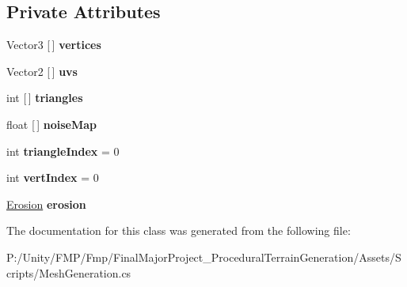 \subsection*{Private Attributes}
\begin{DoxyCompactItemize}
\item 
\mbox{\label{class_assets_1_1_scripts_1_1_mesh_generation_a799f950228628cccb1aa8833e8e697e5}} 
Vector3 \mbox{[}$\,$\mbox{]} {\bfseries vertices}
\item 
\mbox{\label{class_assets_1_1_scripts_1_1_mesh_generation_a3bc484817c8bdafc772df0e3450b6a6e}} 
Vector2 \mbox{[}$\,$\mbox{]} {\bfseries uvs}
\item 
\mbox{\label{class_assets_1_1_scripts_1_1_mesh_generation_acc68d6d74ad0eaa72a23fb8f6e97f941}} 
int \mbox{[}$\,$\mbox{]} {\bfseries triangles}
\item 
\mbox{\label{class_assets_1_1_scripts_1_1_mesh_generation_a47741dd4c95c3c4b5ed92e0f739ecf1f}} 
float \mbox{[}$\,$\mbox{]} {\bfseries noise\+Map}
\item 
\mbox{\label{class_assets_1_1_scripts_1_1_mesh_generation_aeb9558854a993376fc2344987f9eb639}} 
int {\bfseries triangle\+Index} = 0
\item 
\mbox{\label{class_assets_1_1_scripts_1_1_mesh_generation_a28f4c6f120f9e53b59b21f7c2629f100}} 
int {\bfseries vert\+Index} = 0
\item 
\mbox{\label{class_assets_1_1_scripts_1_1_mesh_generation_a000e9fde649beba061d38980768af3fe}} 
\mbox{\hyperlink{class_assets_1_1_scripts_1_1_erosion}{Erosion}} {\bfseries erosion}
\end{DoxyCompactItemize}


The documentation for this class was generated from the following file\+:\begin{DoxyCompactItemize}
\item 
P\+:/\+Unity/\+F\+M\+P/\+Fmp/\+Final\+Major\+Project\+\_\+\+Procedural\+Terrain\+Generation/\+Assets/\+Scripts/Mesh\+Generation.\+cs\end{DoxyCompactItemize}
